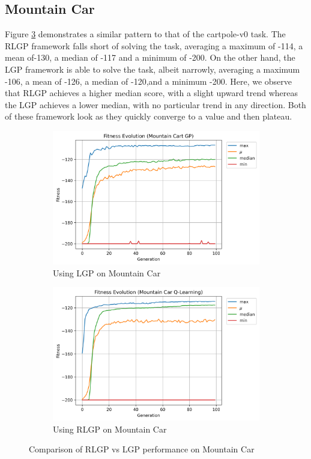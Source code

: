 \documentclass[12pt, final]{dalcsthesis}
\begin{document}
\subsection{Mountain Car}

Figure \ref{fig:mountain-car-comparison} demonstrates a similar pattern to that of the cartpole-v0 task. The RLGP framework falls short of solving the task, averaging a maximum of -114, a mean of-130, a median of -117 and a minimum of -200. On the other hand, the LGP framework is able to solve the task, albeit narrowly, averaging a maximum -106, a mean of -126, a median of -120,and a minimum -200. Here, we observe that RLGP achieves a higher median score, with a slight upward trend whereas the LGP achieves a lower median, with no particular trend in any direction. Both of these framework look as they quickly converge to a value and then plateau.

\begin{figure}[hb]
	\centering
	\begin{subfigure}{1.0\textwidth}
		\includegraphics[width=\linewidth]{mountain_car_lgp.png}
		\caption{Using LGP on Mountain Car}
		\label{fig:mountain-car-lgp}
	\end{subfigure}
	\hfill
	\begin{subfigure}{1.0\textwidth}
		\includegraphics[width=\linewidth]{mountain_car_q.png}
		\caption{Using RLGP on Mountain Car}
		\label{fig:mountain-car-q}
	\end{subfigure}
	\caption{Comparison of RLGP vs LGP performance on Mountain Car}
	\label{fig:mountain-car-comparison}
\end{figure}
\end{document}
